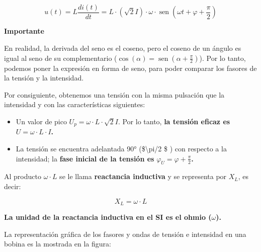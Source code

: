 \documentclass[
  a4paper,
  DIV=11,
  numbers=noendperiod]{scrreprt}
\newcommand{\sen}{\operatorname{sen}}
\begin{document}
\[u(t) = L \frac{di(t)}{dt} = L \cdot (\sqrt{2}I) \cdot \omega \cdot \sen(\omega  t + \varphi + \frac{\pi}{2})\]

\begin{tcolorbox}[enhanced jigsaw, breakable, colback=white, left=2mm, leftrule=.75mm, rightrule=.15mm, toprule=.15mm, colframe=quarto-callout-note-color-frame, arc=.35mm, bottomrule=.15mm, opacityback=0]

\vspace{-3mm}\textbf{Importante}\vspace{3mm}

En realidad, la derivada del seno es el coseno, pero el coseno de un
ángulo es igual al seno de su complementario
(\(\cos(\alpha) = \sen(\alpha + \frac{\pi}{2})\)). Por lo tanto, podemos
poner la expresión en forma de seno, para poder comparar los fasores de
la tensión y la intensidad.

\end{tcolorbox}

Por consiguiente, obtenemos una tensión con la misma pulsación que la
intensidad y con las características siguientes:

\begin{itemize}
\item
  Un valor de pico \(U_p=\omega \cdot L \cdot \sqrt{2} I\). Por lo
  tanto, \textbf{la tensión eficaz es}
  \(U=\omega \cdot L \cdot I\)\textbf{.}
\item
  La tensión se encuentra adelantada 90° (\$\textbackslash pi/2 \$ ) con
  respecto a la intensidad; la \textbf{fase inicial de la tensión es}
  \(\varphi_U = \varphi + \frac{\pi}{2}\)\textbf{.}
\end{itemize}

Al producto \(\omega \cdot L\) se le llama \textbf{reactancia inductiva}
y se representa por \(X_L\), es decir:

\begin{tcolorbox}[enhanced jigsaw, breakable, colback=white, left=2mm, leftrule=.75mm, rightrule=.15mm, toprule=.15mm, colframe=quarto-callout-caution-color-frame, arc=.35mm, bottomrule=.15mm, opacityback=0]

\[
X_L=\omega \cdot L
\]

\end{tcolorbox}

\textbf{La unidad de la reactancia inductiva en el SI es el ohmio
(}\(\omega\)\textbf{).}

La representación gráfica de los fasores y ondas de tensión e intensidad
en una bobina es la mostrada en la figura:
\end{document}
